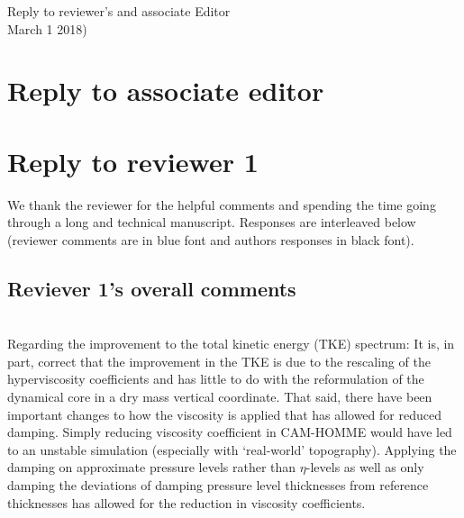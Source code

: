\documentclass[11pt]{article}
\begin{document}
\begin{center}
 {\large   \sf Reply to reviewer's and associate Editor}\\
    \vspace{.1in}
    March 1 2018)
  \end{center}
\section{Reply to associate editor}

\section{Reply to reviewer 1}
We thank the reviewer for the helpful comments and spending the time going through a long and technical manuscript. Responses are interleaved below (reviewer comments are in blue font and authors responses in black font). 
\subsection{Reviever 1's overall comments}
{\color{blue}{
This is a well-written and mostly comprehensive paper describing a new dynamical core, and should be published to document the advances described within and the dynamical core characteristics.}}

{\color{blue}{
 I do feel that some of the major changes compared with the earlier CAM-HOMME are not well-justified, while some of the improvements demonstrated (especially with regard to the kinetic energy spectrum) are a re-configuration of the model and not intrinsic to the core formulation.}}\\

Regarding the improvement to the total kinetic energy (TKE) spectrum: It is, in part, correct that the improvement in the TKE is due to the rescaling of the hyperviscosity coefficients and has little to do with the reformulation of the dynamical core in a dry mass vertical coordinate. That said, there have been important changes to how the viscosity is applied that has allowed for reduced damping. Simply reducing viscosity coefficient in CAM-HOMME would have led to an unstable simulation (especially with `real-world' topography). Applying the damping on approximate pressure levels rather than $\eta$-levels as well as only damping the deviations of damping pressure level thicknesses from reference thicknesses has allowed for the reduction in viscosity coefficients.\\
\end{document}

